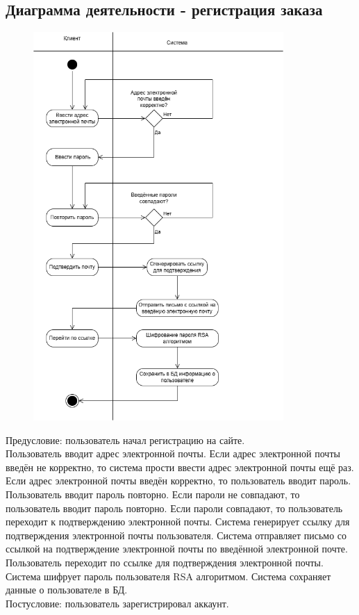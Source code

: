 \documentclass[a4paper]{report}
\begin{document}
\subsection{Диаграмма деятельности - регистрация заказа}
\begin{figure}[H]
    \centering
    \includegraphics[width=0.85\textwidth]{Диаграмма деятельности регистрация.png}
\end{figure}
Предусловие: пользователь начал регистрацию на сайте.\\
Пользователь вводит адрес электронной почты. Если адрес электронной почты введён не корректно, то система прости ввести адрес электронной почты ещё раз. Если адрес электронной почты введён корректно, то пользователь вводит пароль. Пользователь вводит пароль повторно. Если пароли не совпадают, то пользователь вводит пароль повторно. Если пароли совпадают, то пользователь переходит к подтверждению электронной почты. Система генерирует ссылку для подтверждения электронной почты пользователя. Система отправляет письмо со ссылкой на подтверждение электронной почты по введённой электронной почте. Пользователь переходит по ссылке для подтверждения электронной почты. Система шифрует пароль пользователя RSA алгоритмом. Система сохраняет данные о пользователе в БД.\\
Постусловие: пользователь зарегистрировал аккаунт.
\end{document}
